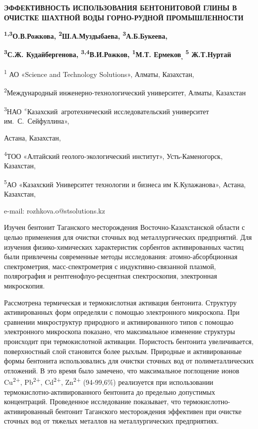 \textbf{ЭФФЕКТИВНОСТЬ ИСПОЛЬЗОВАНИЯ БЕНТОНИТОВОЙ ГЛИНЫ В ОЧИСТКЕ ШАХТНОЙ
ВОДЫ ГОРНО-РУДНОЙ ПРОМЫШЛЕННОСТИ}

\textbf{\textsuperscript{1,3}О.В.Рожкова,
\textsuperscript{2}Ш.А.Муздыбаева, \textsuperscript{3}А.Б.Букеева,}

\textbf{\textsuperscript{3}С.Ж. Кудайбергенова,
\textsuperscript{3,4}В.И.Рожков, \textsuperscript{1}М.Т.
Ермеков\textsubscript{,} \textsuperscript{5} Ж.Т.Нуртай}

\textsuperscript{1} АО «Science and Technology Solutions», Алматы,
Казахстан,

\textsuperscript{2}Международный инженерно-технологический университет,
Алматы, Казахстан

\textsuperscript{3}НАО \textsuperscript{«}Казахский~агротехнический
исследовательский университет им.~С.~Сейфуллина»,

Астана, Казахстан,

\textsuperscript{4}ТОО «Алтайский геолого-экологический институт»,
Усть-Каменогорск, Казахстан,

\textsuperscript{5}АО «Казахский Университет технологии и бизнеса им
К.Кулажанова», Астана, Казахстан,

e-mail: rozhkova.o@stsolutions.kz

Изучен бентонит Таганского месторождения Восточно-Казахстанской области
с целью применения для очистки сточных вод металлургических предприятий.
Для изучения физико-химических характеристик сорбентов активированных
частиц были привлечены современные методы исследования:
атомно-абсорбционная спектрометрия, масс-спектрометрия с
индуктивно-связанной плазмой, полярография и рентгенофлуо-ресцентная
спектроскопия, электронная микроскопия.

Рассмотрена термическая и термокислотная активация бентонита. Структуру
активированных форм определяли с помощью электронного микроскопа. При
сравнении микроструктур природного и активированного типов с помощью
электронного микроскопа показано, что максимальное изменение структуры
происходит при термокислотной активации. Пористость бентонита
увеличивается, поверхностный слой становится более рыхлым. Природные и
активированные формы бентонита использовались для очистки сточных вод от
полиметаллических отложений. В это время было замечено, что максимальное
поглощение ионов Cu\textsuperscript{2+}, Pb\textsuperscript{2+},
Cd\textsuperscript{2+}, Zn\textsuperscript{2+} (94-99,6\%) реализуется
при использовании термокислотно-активированного бентонита до предельно
допустимых концентраций. Проведенное исследование показывает, что
термокислотно-активированный бентонит Таганского месторождения
эффективен при очистке сточных вод от тяжелых металлов на
металлургических предприятиях.

